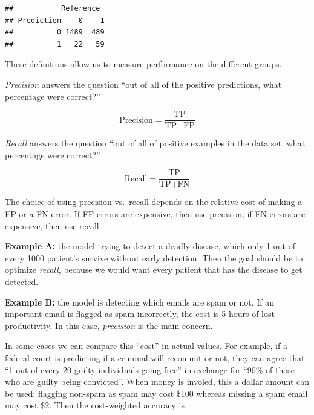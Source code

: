 \documentclass[openany]{book}
\newenvironment{Shaded}{\begin{snugshade}}{\end{snugshade}}
\newcommand{\KeywordTok}[1]{\textcolor[rgb]{0.13,0.29,0.53}{\textbf{#1}}}
\newcommand{\NormalTok}[1]{#1}
\newcommand{\OperatorTok}[1]{\textcolor[rgb]{0.81,0.36,0.00}{\textbf{#1}}}
\begin{document}
\begin{Shaded}
\end{Shaded}

\begin{verbatim}
##           Reference
## Prediction    0    1
##          0 1489  489
##          1   22   59
\end{verbatim}

These definitions allow us to measure performance on the different groups.

\emph{Precision} answers the question ``out of all of the positive predictions, what percentage were correct?''

\[\text{Precision} = \frac{\text{TP}}{\text{TP} + \text{FP}}\]

\emph{Recall} answers the question ``out of all of positive examples in the data set, what percentage were correct?''

\[\text{Recall} = \frac{\text{TP}}{\text{TP} + \text{FN}}\]

The choice of using precision vs.~recall depends on the relative cost of making a FP or a FN error. If FP errors are expensive, then use precision; if FN errors are expensive, then use recall.

\textbf{Example A:} the model trying to detect a deadly disease, which only 1 out of every 1000 patient's survive without early detection. Then the goal should be to optimize \emph{recall}, because we would want every patient that has the disease to get detected.

\textbf{Example B:} the model is detecting which emails are spam or not. If an important email is flagged as spam incorrectly, the cost is 5 hours of lost productivity. In this case, \emph{precision} is the main concern.

In some cases we can compare this ``cost'' in actual values. For example, if a federal court is predicting if a criminal will recommit or not, they can agree that ``1 out of every 20 guilty individuals going free'' in exchange for ``90\% of those who are guilty being convicted''. When money is involed, this a dollar amount can be used: flagging non-spam as spam may cost \$100 whereas missing a spam email may cost \$2. Then the cost-weighted accuracy is
\end{document}
